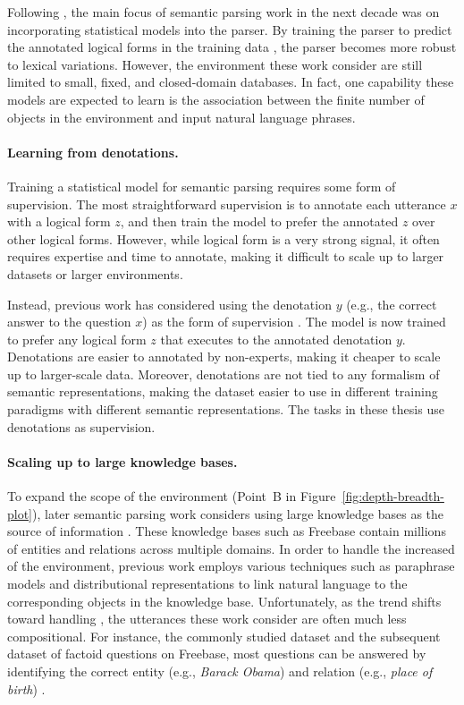 Following \citet{zelle96geoquery},
the main focus of semantic parsing work
in the next decade
was on incorporating
statistical models into the parser.
By training the parser to predict the annotated logical forms
in the training data
\cite{zettlemoyer07relaxed,kwiatkowski11lex},
the parser becomes more robust to lexical variations.
However, the environment these work consider
are still limited to small, fixed, and closed-domain databases.
In fact, one capability these models are expected to learn
is the association between the finite number
of objects in the environment and 
input natural language phrases.

\paragraph{Learning from denotations.}
Training a statistical model for semantic parsing
requires some form of supervision.
The most straightforward supervision is to annotate
each utterance $x$ with a logical form $z$,
and then train the model to prefer the annotated $z$
over other logical forms.
However,
while logical form is a very strong signal,
it often requires expertise and time to annotate,
making it difficult to scale up to larger datasets
or larger environments.

Instead, previous work has considered using
the denotation $y$ (e.g., the correct answer to the
question $x$) as the form of supervision
\cite{clarke10world,liang11dcs}.
The model is now trained to prefer any logical form $z$
that executes to the annotated denotation $y$.
Denotations are easier to annotated by non-experts,
making it cheaper to scale up to larger-scale data.
Moreover, denotations are not tied to any formalism
of semantic representations,
making the dataset easier to use in different training paradigms
with different semantic representations.
The tasks in these thesis use denotations as supervision.

\paragraph{Scaling up to large knowledge bases.}
To expand the scope of the environment
(Point~B in Figure~\ref{fig:depth-breadth-plot}),
later semantic parsing work considers using
large knowledge bases as the source of information
\cite{cai2013large,berant2013freebase}.
These knowledge bases such as
Freebase \cite{freebase2013dump} contain
millions of entities and relations
across multiple domains.
In order to handle the increased \Breadth
of the environment,
previous work employs various techniques such as
paraphrase models \cite{berant2014paraphrasing}
and distributional representations \cite{bordes2015simple}
to link natural language to the corresponding
objects in the knowledge base.
Unfortunately,
as the trend shifts toward handling \Breadth,
the utterances these work consider are often
much less compositional.
For instance, the commonly studied
 dataset \cite{berant2013freebase}
and the subsequent  dataset
\cite{bordes2015simple}
of factoid questions on Freebase,
most questions can be answered by identifying the correct
entity (e.g., \emph{Barack Obama})
and relation (e.g., \emph{place of birth})
\cite{yao2014freebase}.

